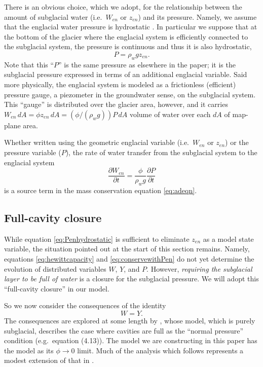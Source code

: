 \documentclass[11pt,final]{amsart}%
\begin{document}
There is an obvious choice, which we adopt, for the relationship between the amount of subglacial water (i.e.~$W_{en}$ or $z_{en}$) and its pressure.  Namely, we assume that the englacial water pressure is hydrostatic \citep{Bartholomausetal2011}.  In particular we suppose that at the bottom of the glacier where the englacial system is efficiently connected to the subglacial system, the pressure is continuous and thus it is also hydrostatic,
\begin{equation}
P = \rho_w g z_{en}. \label{eq:Penhydrostatic}
\end{equation}
Note that this ``$P$'' is the same pressure as elsewhere in the paper; it is the subglacial pressure expressed in terms of an additional englacial variable.  Said more physically, the englacial system is modeled as a frictionless (efficient) pressure gauge, a piezometer in the groundwater sense, on the subglacial system.  This ``gauge'' is distributed over the glacier area, however, and it carries $W_{en}\, dA = \phi z_{en}\, dA = (\phi/(\rho_w g)) P\, dA$ volume of water over each $dA$ of map-plane area.

Whether written using the geometric englacial variable (i.e.~$W_{en}$ or $z_{en}$) or the pressure variable ($P$), the rate of water transfer from the subglacial system to the englacial system
\begin{equation}
\frac{\partial W_{en}}{\partial t} = \frac{\phi}{\rho_w g} \frac{\partial P}{\partial t} \label{eq:ratePenWen}
\end{equation}
is a source term in the mass conservation equation \eqref{eq:adeqn}.

\subsection*{Full-cavity closure}  While equation \eqref{eq:Penhydrostatic} is sufficient to eliminate $z_{en}$ as a model state variable, the situation pointed out at the start of this section remains.  Namely, equations \eqref{eq:hewittcapacity} and \eqref{eq:conservewithPen} do not yet determine the evolution of distributed variables $W$, $Y$, and $P$.  However, \emph{requiring the subglacial layer to be full of water} is a closure for the subglacial pressure.  We will adopt this ``full-cavity closure'' in our model.

So we now consider the consequences of the identity
\begin{equation}
W = Y.\label{eq:strongclosure}
\end{equation}
The consequences are explored at some length by \cite{Schoofetal2012}, whose model, which is purely subglacial, describes the case where cavities are full as the ``normal pressure'' condition (e.g.~equation (4.13)).  The model we are constructing in this paper has the \cite{Schoofetal2012} model as its $\phi\to 0$ limit.    Much of the analysis which follows represents a modest extension of that in \cite{Schoofetal2012}.
\end{document}
